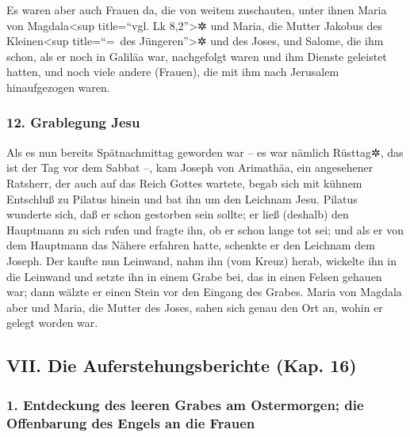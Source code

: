  Es waren aber auch Frauen da, die von weitem zuschauten,
unter ihnen Maria von Magdala\textless sup title=``vgl. Lk
8,2''\textgreater✲ und Maria, die Mutter Jakobus des
Kleinen\textless sup title=``=~des Jüngeren''\textgreater✲ und des
Joses, und Salome,  die ihm schon, als er noch in Galiläa
war, nachgefolgt waren und ihm Dienste geleistet hatten, und noch viele
andere (Frauen), die mit ihm nach Jerusalem hinaufgezogen waren.

\hypertarget{grablegung-jesu}{%
\subsubsection{12. Grablegung Jesu}\label{grablegung-jesu}}

 Als es nun bereits Spätnachmittag geworden war -- es war
nämlich Rüsttag✲, das ist der Tag vor dem Sabbat --,  kam
Joseph von Arimathäa, ein angesehener Ratsherr, der auch auf das Reich
Gottes wartete, begab sich mit kühnem Entschluß zu Pilatus hinein und
bat ihn um den Leichnam Jesu.  Pilatus wunderte sich, daß
er schon gestorben sein sollte; er ließ (deshalb) den Hauptmann zu sich
rufen und fragte ihn, ob er schon lange tot sei;  und als
er von dem Hauptmann das Nähere erfahren hatte, schenkte er den Leichnam
dem Joseph.  Der kaufte nun Leinwand, nahm ihn (vom
Kreuz) herab, wickelte ihn in die Leinwand und setzte ihn in einem Grabe
bei, das in einen Felsen gehauen war; dann wälzte er einen Stein vor den
Eingang des Grabes.  Maria von Magdala aber und Maria,
die Mutter des Joses, sahen sich genau den Ort an, wohin er gelegt
worden war.

\hypertarget{vii.-die-auferstehungsberichte-kap.-16}{%
\subsection{VII. Die Auferstehungsberichte (Kap.
16)}\label{vii.-die-auferstehungsberichte-kap.-16}}

\hypertarget{entdeckung-des-leeren-grabes-am-ostermorgen-die-offenbarung-des-engels-an-die-frauen}{%
\subsubsection{1. Entdeckung des leeren Grabes am Ostermorgen; die
Offenbarung des Engels an die
Frauen}\label{entdeckung-des-leeren-grabes-am-ostermorgen-die-offenbarung-des-engels-an-die-frauen}}

